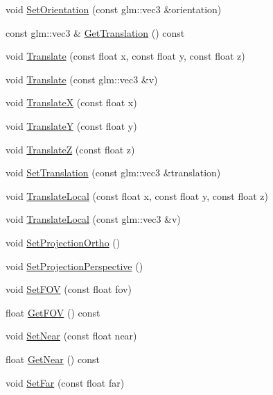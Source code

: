 \begin{DoxyCompactItemize}
void \mbox{\hyperlink{classec_1_1_camera_a274f4356818f347c9452a94070780636}{Set\+Orientation}} (const glm\+::vec3 \&orientation)
\item 
const glm\+::vec3 \& \mbox{\hyperlink{classec_1_1_camera_a0f77ddae83a5b37600aa2863f235115b}{Get\+Translation}} () const
\item 
void \mbox{\hyperlink{classec_1_1_camera_a5219ecd1eef5a489dee8655609441a66}{Translate}} (const float x, const float y, const float z)
\item 
void \mbox{\hyperlink{classec_1_1_camera_a89e831dd0fbd418a7579b820679cdb01}{Translate}} (const glm\+::vec3 \&v)
\item 
void \mbox{\hyperlink{classec_1_1_camera_abc49923c90863ffd6f6f27d5b90927af}{TranslateX}} (const float x)
\item 
void \mbox{\hyperlink{classec_1_1_camera_ad029362d66dfd6679c83ab5a8374a030}{TranslateY}} (const float y)
\item 
void \mbox{\hyperlink{classec_1_1_camera_ad84cc6c7f90896450c8e884140176277}{TranslateZ}} (const float z)
\item 
void \mbox{\hyperlink{classec_1_1_camera_acb82ba3751feefd0753d5d318839b826}{Set\+Translation}} (const glm\+::vec3 \&translation)
\item 
void \mbox{\hyperlink{classec_1_1_camera_ac3a7ee291d1f574d1f1aae580b11ec6f}{Translate\+Local}} (const float x, const float y, const float z)
\item 
void \mbox{\hyperlink{classec_1_1_camera_a0cd6ecdeabaa08b179aeb0a21f126ccc}{Translate\+Local}} (const glm\+::vec3 \&v)
\item 
void \mbox{\hyperlink{classec_1_1_camera_ad17ef414e3a08344607a4929f89c7ab3}{Set\+Projection\+Ortho}} ()
\item 
void \mbox{\hyperlink{classec_1_1_camera_a5d6b64ba57b209cca822f4ca9e278a44}{Set\+Projection\+Perspective}} ()
\item 
void \mbox{\hyperlink{classec_1_1_camera_a9af6e8b9a37d5494b5ddf6f098f463bc}{Set\+F\+OV}} (const float fov)
\item 
float \mbox{\hyperlink{classec_1_1_camera_a076c35547c2e64166ac3307b13292131}{Get\+F\+OV}} () const
\item 
void \mbox{\hyperlink{classec_1_1_camera_af2069e18dee1923fb5d9c77bf9366479}{Set\+Near}} (const float near)
\item 
float \mbox{\hyperlink{classec_1_1_camera_abf0024083abfe06c0e5de606ee2b8912}{Get\+Near}} () const
\item 
void \mbox{\hyperlink{classec_1_1_camera_adb376b3c35aed1e7681f74ddbbe9fa25}{Set\+Far}} (const float far)

\end{DoxyCompactItemize}
